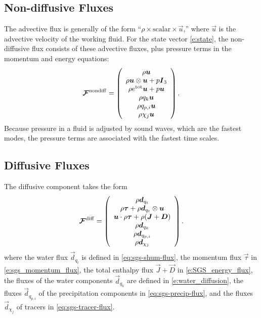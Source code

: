 \documentclass{report}
\begin{document}
\subsection{Non-diffusive Fluxes}

The advective flux is generally of the form ``$\rho \times \mathrm{scalar} \times \vec{u}$,'' where $\vec{u}$ is the advective velocity of the working fluid. For the state vector \eqref{e:state}, the non-diffusive flux consists of these advective fluxes, plus pressure terms in the momentum and energy equations: 
 \begin{equation}
 \label{e:adv_flux}
 \boldsymbol{{\mathcal{F}}}^{\mathrm{nondiff}}=\left( \begin{array}{c}
 \rho \boldsymbol{{u}} \\
 \rho \boldsymbol{{u}} \otimes \boldsymbol{{u}} + p \boldsymbol{{I}}_3 \\
 \rho e^{\mathrm{tot}} \boldsymbol{{u}} + p \boldsymbol{{u}}\\
 \rho q_k \boldsymbol{{u}}\\
 \rho q_{p,i} \boldsymbol{{u}} \\
 \rho \chi_j \boldsymbol{{u}}
\end{array}
\right).
 \end{equation}
Because pressure in a fluid is adjusted by sound waves, which are the fastest modes, the pressure terms are associated with the fastest time scales. 

\subsection{Diffusive Fluxes}

 The diffusive component takes the form 
 \begin{equation}
 \boldsymbol{{\mathcal{F}}}^{\mathrm{diff}}=\left( \begin{array}{c}
 \rho\boldsymbol{{d}}_{q_t} \\
 \rho\boldsymbol{{\tau}} + \rho\boldsymbol{{d}}_{q_t} \otimes \boldsymbol{{u}}\\
 \boldsymbol{{u}} \cdot \rho\boldsymbol{{\tau}} + \rho (\boldsymbol{{J}} + \boldsymbol{{D}}) \\
\rho\boldsymbol{{d}}_{q_k}\\
\rho \boldsymbol{{d}}_{q_{p, i}}\\
\rho \boldsymbol{{d}}_{\chi_j}
\end{array}
\right).
\label{eq:diff_flux}
\end{equation}
where the water flux $\vec{d}_{q_t}$ is defined in \eqref{eq:sgs-shum-flux}, the momentum flux $\vec{\tau}$ in \eqref{e:sgs_momentum_flux}, the total enthalpy flux $\vec{J} + \vec{D}$ in \eqref{e:SGS_energy_flux}, the fluxes of the water components $\vec{d}_{q_k}$ are defined in \eqref{e:water_diffusion}, the fluxes $\vec{d}_{q_{p, i}}$ of the precipitation components in \eqref{eq:sgs-precip-flux}, and the fluxes $\vec{d}_{\chi_j}$ of tracers in \eqref{eq:sgs-tracer-flux}.
\end{document}
